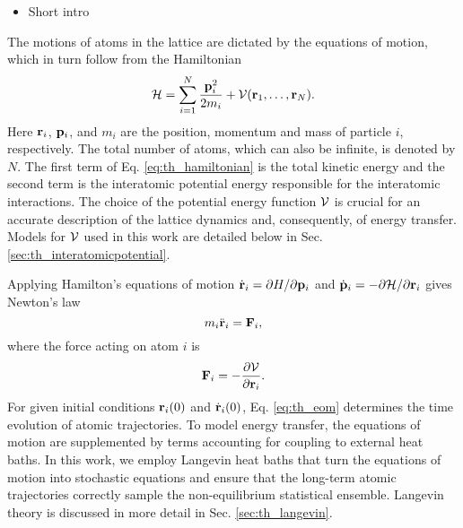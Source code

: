 \begin{itemize}
 \item Short intro
\end{itemize}


The motions of atoms in the lattice are dictated by the equations of motion, which in turn follow from the Hamiltonian \cite{ziman}
\begin{equation}
 \mathcal{H} = \sum_{i=1}^N \frac{\mathbf{p}_i^2}{2m_i} + \mathcal{V}(\mathbf{r}_1,\dots,\mathbf{r}_N). \label{eq:th_hamiltonian}
\end{equation}
Here $\mathbf{r}_i$, $\mathbf{p}_i$, and $m_i$ are the position, momentum and mass of particle $i$, respectively. The total number of atoms, which can also be infinite, is denoted by $N$. The first term of Eq. \eqref{eq:th_hamiltonian} is the total kinetic energy and the second term is the interatomic potential energy responsible for the interatomic interactions. The choice of the potential energy function $\mathcal{V}$ is crucial for an accurate description of the lattice dynamics and, consequently, of energy transfer. Models for $\mathcal{V}$ used in this work are detailed below in Sec. \ref{sec:th_interatomicpotential}.

Applying Hamilton's equations of motion $\dot{\mathbf{r}}_i=\partial H/\partial \mathbf{p}_i$ and $\dot{\mathbf{p}}_i=-\partial \mathcal{H}/\partial \mathbf{r}_i$ \cite{fetter} gives Newton's law
\begin{equation}
 m_i \ddot{\mathbf{r}}_i = \mathbf{F}_i, \label{eq:th_eom}
\end{equation}
where the force acting on atom $i$ is
\begin{equation}
 \mathbf{F}_i = - \frac{\partial \mathcal{V}}{\partial \mathbf{r}_i}. \label{eq:th_force}
\end{equation}
For given initial conditions $\mathbf{r}_i(0)$ and $\dot{\mathbf{r}}_i(0)$, Eq. \eqref{eq:th_eom} determines the time evolution of atomic trajectories. To model energy transfer, the equations of motion are supplemented by terms accounting for coupling to external heat baths. In this work, we employ Langevin heat baths that turn the equations of motion into stochastic equations and ensure that the long-term atomic trajectories correctly sample the non-equilibrium statistical ensemble. Langevin theory is discussed in more detail in Sec. \ref{sec:th_langevin}.

